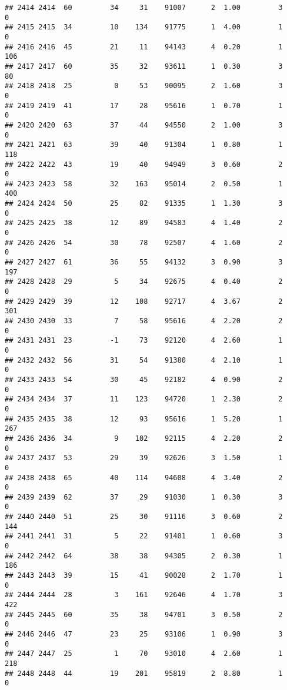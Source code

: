 \documentclass[
]{article}
\begin{document}
\begin{verbatim}
## 2414 2414  60         34     31    91007      2  1.00         3        0
## 2415 2415  34         10    134    91775      1  4.00         1        0
## 2416 2416  45         21     11    94143      4  0.20         1      106
## 2417 2417  60         35     32    93611      1  0.30         3       80
## 2418 2418  25          0     53    90095      2  1.60         3        0
## 2419 2419  41         17     28    95616      1  0.70         1        0
## 2420 2420  63         37     44    94550      2  1.00         3        0
## 2421 2421  63         39     40    91304      1  0.80         1      118
## 2422 2422  43         19     40    94949      3  0.60         2        0
## 2423 2423  58         32    163    95014      2  0.50         1      400
## 2424 2424  50         25     82    91335      1  1.30         3        0
## 2425 2425  38         12     89    94583      4  1.40         2        0
## 2426 2426  54         30     78    92507      4  1.60         2        0
## 2427 2427  61         36     55    94132      3  0.90         3      197
## 2428 2428  29          5     34    92675      4  0.40         2        0
## 2429 2429  39         12    108    92717      4  3.67         2      301
## 2430 2430  33          7     58    95616      4  2.20         2        0
## 2431 2431  23         -1     73    92120      4  2.60         1        0
## 2432 2432  56         31     54    91380      4  2.10         1        0
## 2433 2433  54         30     45    92182      4  0.90         2        0
## 2434 2434  37         11    123    94720      1  2.30         2        0
## 2435 2435  38         12     93    95616      1  5.20         1      267
## 2436 2436  34          9    102    92115      4  2.20         2        0
## 2437 2437  53         29     39    92626      3  1.50         1        0
## 2438 2438  65         40    114    94608      4  3.40         2        0
## 2439 2439  62         37     29    91030      1  0.30         3        0
## 2440 2440  51         25     30    91116      3  0.60         2      144
## 2441 2441  31          5     22    91401      1  0.60         3        0
## 2442 2442  64         38     38    94305      2  0.30         1      186
## 2443 2443  39         15     41    90028      2  1.70         1        0
## 2444 2444  28          3    161    92646      4  1.70         3      422
## 2445 2445  60         35     38    94701      3  0.50         2        0
## 2446 2446  47         23     25    93106      1  0.90         3        0
## 2447 2447  25          1     70    93010      4  2.60         1      218
## 2448 2448  44         19    201    95819      2  8.80         1        0

\end{verbatim}
\end{document}
